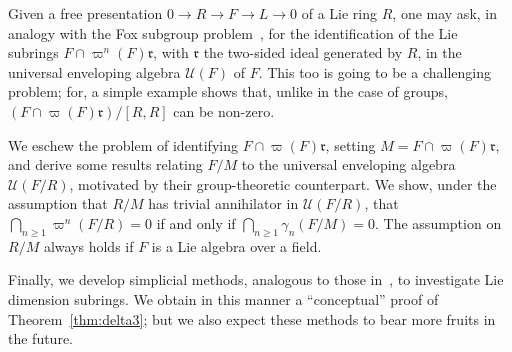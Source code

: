 \documentclass[a4paper,reqno,notitlepage]{amsart}
\theoremstyle{definition}
\newcommand\rr{{\mathfrak r}}
\newcommand\U{\mathscr U}
\begin{document}
Given a free presentation $0\to R\to F\to L\to 0$ of a Lie ring $R$,
one may ask, in analogy with the Fox subgroup
problem~\cites{Fox:1953,Gupta:87}, for the identification of the Lie
subrings $F\cap \varpi^n(F)\rr$, with $\rr$ the two-sided ideal
generated by $R$, in the universal enveloping algebra $\U(F)$ of
$F$. This too is going to be a challenging problem; for, a simple
example shows that, unlike in the case of groups, $(F\cap
\varpi(F)\rr)/[R,R]$ can be non-zero.

We eschew the problem of identifying $F\cap\varpi(F)\rr$, setting
$M=F\cap\varpi(F)\rr$, and derive some results relating $F/M$ to the
universal enveloping algebra $\U(F/R)$, motivated by their
group-theoretic counterpart. We show, under the assumption that $R/M$
has trivial annihilator in $\U(F/R)$, that
$\bigcap_{n\ge1}\varpi^n(F/R)=0$ if and only if
$\bigcap_{n\ge1}\gamma_n(F/M)=0$. The assumption on $R/M$ always holds
if $F$ is a Lie algebra over a field.

Finally, we develop simplicial methods, analogous to those
in~\cites{HMP:07,MP:09}, to investigate Lie dimension subrings. We
obtain in this manner a ``conceptual'' proof of
Theorem~\ref{thm:delta3}; but we also expect these methods to bear
more fruits in the future.

\end{document}
